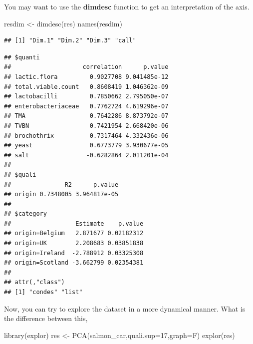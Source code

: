 \documentclass[
]{book}
\newenvironment{Shaded}{\begin{snugshade}}{\end{snugshade}}
\newcommand{\AttributeTok}[1]{\textcolor[rgb]{0.77,0.63,0.00}{#1}}
\newcommand{\DecValTok}[1]{\textcolor[rgb]{0.00,0.00,0.81}{#1}}
\newcommand{\FloatTok}[1]{\textcolor[rgb]{0.00,0.00,0.81}{#1}}
\newcommand{\FunctionTok}[1]{\textcolor[rgb]{0.00,0.00,0.00}{#1}}
\newcommand{\NormalTok}[1]{#1}
\newcommand{\OtherTok}[1]{\textcolor[rgb]{0.56,0.35,0.01}{#1}}
\newcommand{\SpecialCharTok}[1]{\textcolor[rgb]{0.00,0.00,0.00}{#1}}
\begin{document}
You may want to use the \textbf{dimdesc} function to get an interpretation of the axis.

\begin{Shaded}
\begin{Highlighting}[]
\NormalTok{resdim }\OtherTok{\textless{}{-}} \FunctionTok{dimdesc}\NormalTok{(res)}
\FunctionTok{names}\NormalTok{(resdim)}
\end{Highlighting}
\end{Shaded}

\begin{verbatim}
## [1] "Dim.1" "Dim.2" "Dim.3" "call"
\end{verbatim}

\begin{Shaded}
\end{Shaded}

\begin{verbatim}
## $quanti
##                    correlation      p.value
## lactic.flora         0.9027708 9.041485e-12
## total.viable.count   0.8608419 1.046362e-09
## lactobacilli         0.7850662 2.795050e-07
## enterobacteriaceae   0.7762724 4.619296e-07
## TMA                  0.7642286 8.873792e-07
## TVBN                 0.7421954 2.668420e-06
## brochothrix          0.7317464 4.332436e-06
## yeast                0.6773779 3.930677e-05
## salt                -0.6282864 2.011201e-04
## 
## $quali
##               R2      p.value
## origin 0.7348005 3.964817e-05
## 
## $category
##                  Estimate    p.value
## origin=Belgium   2.871677 0.02182312
## origin=UK        2.208683 0.03851838
## origin=Ireland  -2.788912 0.03325308
## origin=Scotland -3.662799 0.02354381
## 
## attr(,"class")
## [1] "condes" "list"
\end{verbatim}

Now, you can try to explore the dataset in a more dynamical manner. What is the difference between this,

\begin{Shaded}
\begin{Highlighting}[]
\FunctionTok{library}\NormalTok{(explor)}
\NormalTok{res }\OtherTok{\textless{}{-}} \FunctionTok{PCA}\NormalTok{(salmon\_car,}\AttributeTok{quali.sup=}\DecValTok{17}\NormalTok{,}\AttributeTok{graph=}\NormalTok{F)}
\FunctionTok{explor}\NormalTok{(res)}
\end{Highlighting}
\end{Shaded}
\end{document}
